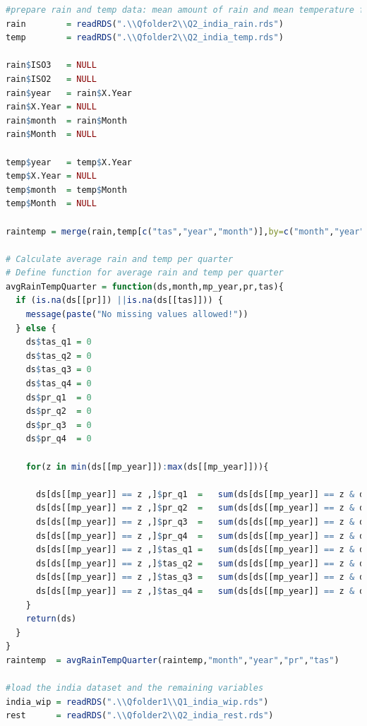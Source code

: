 \documentclass[11pt]{article}
\begin{document}
\begin{lstlisting}[language= R]
#prepare rain and temp data: mean amount of rain and mean temperature for each quarter year
rain        = readRDS(".\\Qfolder2\\Q2_india_rain.rds")
temp        = readRDS(".\\Qfolder2\\Q2_india_temp.rds")

rain$ISO3   = NULL
rain$ISO2   = NULL
rain$year   = rain$X.Year
rain$X.Year = NULL
rain$month  = rain$Month
rain$Month  = NULL

temp$year   = temp$X.Year
temp$X.Year = NULL
temp$month  = temp$Month
temp$Month  = NULL

raintemp = merge(rain,temp[c("tas","year","month")],by=c("month","year"))

# Calculate average rain and temp per quarter
# Define function for average rain and temp per quarter
avgRainTempQuarter = function(ds,month,mp_year,pr,tas){
  if (is.na(ds[[pr]]) ||is.na(ds[[tas]])) {
    message(paste("No missing values allowed!"))
  } else {
    ds$tas_q1 = 0
    ds$tas_q2 = 0
    ds$tas_q3 = 0
    ds$tas_q4 = 0
    ds$pr_q1  = 0
    ds$pr_q2  = 0
    ds$pr_q3  = 0
    ds$pr_q4  = 0
    
    for(z in min(ds[[mp_year]]):max(ds[[mp_year]])){
      
      ds[ds[[mp_year]] == z ,]$pr_q1  =   sum(ds[ds[[mp_year]] == z & ds[[month]] %in% c("1","2","3"),][[pr]])/3
      ds[ds[[mp_year]] == z ,]$pr_q2  =   sum(ds[ds[[mp_year]] == z & ds[[month]] %in% c("4","5","6"),][[pr]])/3
      ds[ds[[mp_year]] == z ,]$pr_q3  =   sum(ds[ds[[mp_year]] == z & ds[[month]] %in% c("7","8","9"),][[pr]])/3
      ds[ds[[mp_year]] == z ,]$pr_q4  =   sum(ds[ds[[mp_year]] == z & ds[[month]] %in% c("10","11","12"),][[pr]])/3
      ds[ds[[mp_year]] == z ,]$tas_q1 =   sum(ds[ds[[mp_year]] == z & ds[[month]] %in% c("1","2","3"),][[tas]])/3
      ds[ds[[mp_year]] == z ,]$tas_q2 =   sum(ds[ds[[mp_year]] == z & ds[[month]] %in% c("4","5","6"),][[tas]])/3
      ds[ds[[mp_year]] == z ,]$tas_q3 =   sum(ds[ds[[mp_year]] == z & ds[[month]] %in% c("7","8","9"),][[tas]])/3
      ds[ds[[mp_year]] == z ,]$tas_q4 =   sum(ds[ds[[mp_year]] == z & ds[[month]] %in% c("10","11","12"),][[tas]])/3
    }
    return(ds)
  }  
}
raintemp  = avgRainTempQuarter(raintemp,"month","year","pr","tas")

#load the india dataset and the remaining variables
india_wip = readRDS(".\\Qfolder1\\Q1_india_wip.rds")
rest      = readRDS(".\\Qfolder2\\Q2_india_rest.rds")



\end{lstlisting}
\end{document}
